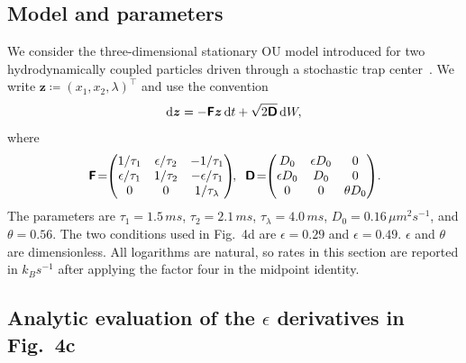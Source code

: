 \subsection{Model and parameters}
\vspace*{-0.6\baselineskip}

We consider the three-dimensional stationary OU model introduced for two hydrodynamically coupled particles driven through a stochastic trap center~\cite{das2025irreversibility}. We write $\bm z\coloneq (x_1,x_2,\lambda)^\intercal$ and use the convention
\begin{equation}
    \mathrm d\bm z=-\boldsymbol{\mathsf{F}}\bm z\,\mathrm dt+\sqrt{2\boldsymbol{\mathsf{D}}}\,\mathrm dW,
\end{equation}
where
\begin{equation*}
    \matbf F\!=\!\!
    \begin{pmatrix}
    1/\tau_1 & \epsilon/{\tau_2} & -1/\tau_1 \\
    \epsilon/\tau_1 & 1/{\tau_2} & -\epsilon/\tau_1 \\
    0 & 0 & 1/\tau_\lambda
    \end{pmatrix}\!\!,
    \;\; 
    \matbf D\!=\!\!
    \begin{pmatrix}
    D_0 & \epsilon D_0 & 0 \\
    \epsilon D_0 & D_0 & 0 \\
    0 & 0 & \theta D_0
    \end{pmatrix}\!.   
    \label{eq:Das_model_details}
\end{equation*}
The parameters are $\tau_1=1.5\,ms$, $\tau_2=2.1\,ms$, $\tau_\lambda=4.0\,ms$, $D_0=0.16\,\mu m^2s^{-1}$, and $\theta=0.56$. The two conditions used in Fig.~4d are $\epsilon=0.29$ and $\epsilon=0.49$. $\epsilon$ and $\theta$ are dimensionless. All logarithms are natural, so rates in this section are reported in $k_B s^{-1}$ after applying the factor four in the midpoint identity.

\subsection{Analytic evaluation of the $\epsilon$ derivatives in Fig.~4c}
\vspace*{-0.6\baselineskip}

